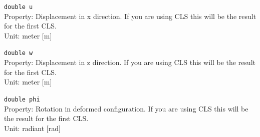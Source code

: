 \begin{trivlist}
\begin{trivlist}
		\item[] \texttt{double u} \\Property: Displacement in x direction. If you are using CLS this will be the result for the first CLS. \\ Unit: meter [m]
		\item[] \texttt{double w} \\Property: Displacement in z direction. If you are using CLS this will be the result for the first CLS. \\ Unit: meter [m]
		\item[] \texttt{double phi} \\Property: Rotation in deformed configuration. If you are using CLS this will be the result for the first CLS. \\ Unit: radiant [rad]
	\end{trivlist}
\end{trivlist}

